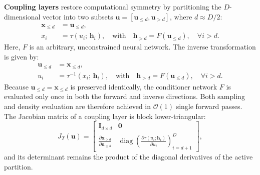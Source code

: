 \documentclass[12pt]{article}
\renewcommand{\vec}[1]{\boldsymbol{\mathbf{#1}}}
\begin{document}
        \textbf{Coupling layers} restore computational symmetry by partitioning the $D$-dimensional vector into two subsets $\vec{u} = [\vec{u}_{\le d}, \vec{u}_{>d}]$, where $d \approx D/2$:
        \begin{align}
            \vec{x}_{\le d} &= \vec{u}_{\le d}, \\
            x_i &= \tau(u_i; \, \vec{h}_i), \quad \text{with} \quad \vec{h}_{>d} = F(\vec{u}_{\le d}), \quad \forall i > d.
        \end{align}
        Here, $F$ is an arbitrary, unconstrained neural network. The inverse transformation is given by:
        \begin{align}
            \vec{u}_{\le d} &= \vec{x}_{\le d}, \\
            u_i &= \tau^{-1}(x_i; \, \vec{h}_i), \quad \text{with} \quad \vec{h}_{>d} = F(\vec{u}_{\le d}), \quad \forall i > d.
        \end{align}
        Because $\vec{u}_{\le d} = \vec{x}_{\le d}$ is preserved identically, the conditioner network $F$ is evaluated only once in both the forward and inverse directions. Both sampling and density evaluation are therefore achieved in $\mathcal{O}(1)$ single forward passes. The Jacobian matrix of a coupling layer is block lower-triangular:
        \begin{equation}
            J_T(\vec{u}) = \begin{bmatrix}
                \mathbf{I}_{d \times d} & \mathbf{0} \\
                \frac{\partial \vec{x}_{>d}}{\partial \vec{u}_{\le d}} & \operatorname{diag}\left( \frac{\partial \tau(u_i; \vec{h}_i)}{\partial u_i} \right)_{i=d+1}^D
            \end{bmatrix},
        \end{equation}
        and its determinant remains the product of the diagonal derivatives of the active partition.





\end{document}
